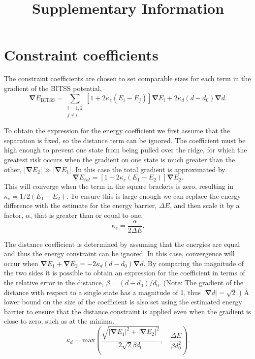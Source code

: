 \documentclass[aps,prl]{revtex4}
\newcommand{\abs}[1]{\left| #1 \right|}
\newcommand{\grad}[1]{\bm{\nabla} #1}
\begin{document}
\title{Supplementary Information}
\maketitle

\section{Constraint coefficients}
The constraint coefficients are chosen to set comparable sizes for each term in the gradient of the BITSS potential,
\begin{equation} \label{eq:gradBITSS}
  \grad{E_\text{BITSS}} = \sum_{\substack{i=1,2 \\ j\neq i}} \left[ 1 + 2 \kappa_e (E_i - E_j) \right] \grad{E_i} + 2 \kappa_d (d - d_0) \grad{d}.
\end{equation}

To obtain the expression for the energy coefficient we first assume that the separation is fixed, so the distance term can be ignored.
The coefficient must be high enough to prevent one state from being pulled over the ridge, for which the greatest risk occurs when the gradient on one state is much greater than the other, $\abs{\grad{E_2}} \gg \abs{\grad{E_1}}$.
In this case the total gradient is approximated by
\begin{equation}
  \grad{E_{tot}} = \left[ 1 - 2 \kappa_e (E_1 - E_2) \right] \grad{E_2}.
\end{equation}
This will converge when the term in the square brackets is zero, resulting in $\kappa_e = 1 / 2 (E_1 - E_2)$.
To ensure this is large enough we can replace the energy difference with the estimate for the energy barrier, $\Delta E$, and then scale it by a factor, $\alpha$, that is greater than or equal to one,
\begin{equation}
  \kappa_e = \frac {\alpha} {2 \Delta E}.
\end{equation}

The distance coefficient is determined by assuming that the energies are equal and thus the energy constraint can be ignored.
In this case, convergence will occur when $\grad{E_1} + \grad{E_2} = -2 \kappa_d (d - d_0) \grad{d}$.
By comparing the magnitude of the two sides it is possible to obtain an expression for the coefficient in terms of the relative error in the distance, $\beta = (d - d_0) / d_0$.
(Note: The gradient of the distance with respect to a single state has a magnitude of 1, thus $\abs{\grad{d}} = \sqrt{2}$.)
A lower bound on the size of the coefficient is also set using the estimated energy barrier to ensure that the distance constraint is applied even when the gradient is close to zero, such as at the minima.
\begin{equation}
  \kappa_d = \mathrm{max} \! \left(
  \frac {\sqrt{\abs{\grad{E_1}}^2 + \abs{\grad{E_2}}^2}} {2 \sqrt{2} \beta d_0}, \quad
  \frac{\Delta E}{\beta d_0^2} \right).
\end{equation}
\end{document}
